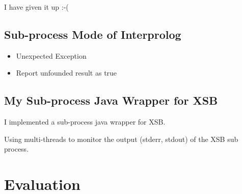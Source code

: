 \documentclass{article}
\begin{document}
I have given it up :-(


\subsection{Sub-process Mode of Interprolog}

\begin{itemize}
\item Unexpected Exception
\item Report unfounded result as true
\end{itemize}

\subsection{My Sub-process Java Wrapper for XSB}

I implemented a sub-process java wrapper for XSB.

Using multi-threads to monitor the output (stderr, stdout) of the XSB
sub process.

\section{Evaluation}
\end{document}
